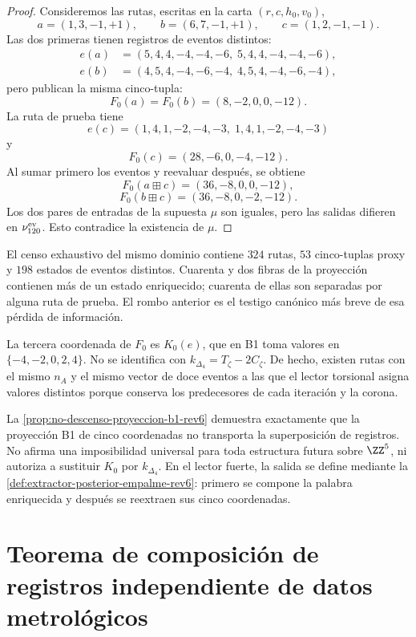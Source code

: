 \begin{proof}
Consideremos las rutas, escritas en la carta
\((r,c,h_0,v_0)\),
\[
 a=(1,3,-1,+1),
 \qquad
 b=(6,7,-1,+1),
 \qquad
 c=(1,2,-1,-1).
\]
Las dos primeras tienen registros de eventos distintos:
\[
\begin{aligned}
 e(a)&=(5,4,4,-4,-4,-6,\;5,4,4,-4,-4,-6),\\
 e(b)&=(4,5,4,-4,-6,-4,\;4,5,4,-4,-6,-4),
\end{aligned}
\]
pero publican la misma cinco-tupla:
\[
 F_0(a)=F_0(b)=(8,-2,0,0,-12).
\]
La ruta de prueba tiene
\[
 e(c)=(1,4,1,-2,-4,-3,\;1,4,1,-2,-4,-3)
\]
y
\[
 F_0(c)=(28,-6,0,-4,-12).
\]
Al sumar primero los eventos y reevaluar después, se obtiene
\[
 F_0(a\boxplus c)=(36,-8,0,0,-12),
\]
\[
 F_0(b\boxplus c)=(36,-8,0,-2,-12).
\]
Los dos pares de entradas de la supuesta \(\mu\) son iguales, pero las
salidas difieren en \(\nu_{120}^{\rm ev}\). Esto contradice la existencia de
\(\mu\).
\end{proof}

El censo exhaustivo del mismo dominio contiene \(324\) rutas, \(53\)
cinco-tuplas proxy y \(198\) estados de eventos distintos. Cuarenta y dos
fibras de la proyección contienen más de un estado enriquecido; cuarenta de
ellas son separadas por alguna ruta de prueba. El rombo anterior es el testigo
canónico más breve de esa pérdida de información.

\begin{remark}
\label{rem:proxy-no-torsion-fuerte-rev6}
La tercera coordenada de \(F_0\) es \(K_0(e)\), que en B1 toma valores en
\(\{-4,-2,0,2,4\}\). No se identifica con
\(k_{\Delta_4}=T_\zeta-2C_\zeta\). De hecho, existen rutas con el mismo
\(n_A\) y el mismo vector de doce eventos a las que el lector torsional
asigna valores distintos porque conserva los predecesores de cada iteración
y la corona.

La \cref{prop:no-descenso-proyeccion-b1-rev6} demuestra exactamente que la
proyección B1 de cinco coordenadas no transporta la superposición de
registros. No afirma una imposibilidad universal para toda estructura futura
sobre \(\ZZ^5\), ni autoriza a sustituir \(K_0\) por
\(k_{\Delta_4}\). En el lector fuerte, la salida se define mediante la
\cref{def:extractor-posterior-empalme-rev6}: primero se compone la palabra
enriquecida y después se reextraen sus cinco coordenadas.
\end{remark}

\section{Teorema de composición de registros independiente de datos metrológicos}
\label{sec:teorema-composicional-sin-blancos-rev6}

